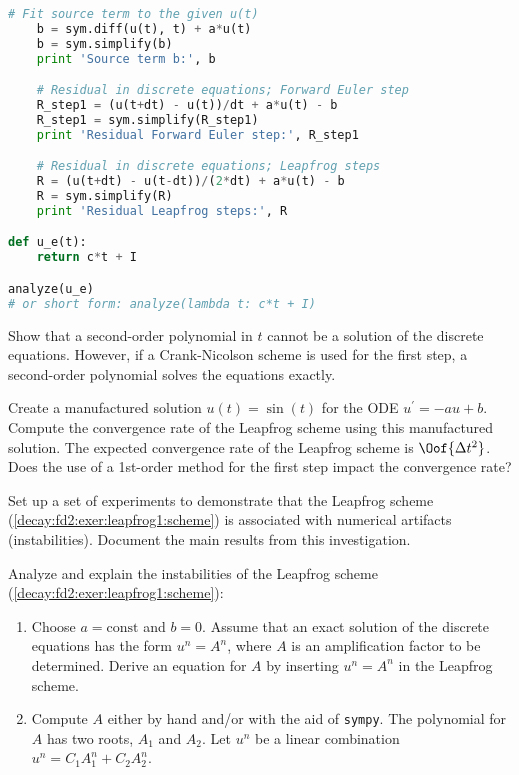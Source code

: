 \documentclass[graybox,sectrefs,envcountresetchap,open=right,final]{svmonodo}
\newenvironment{doconceexercise}{}{}
\begin{document}
\begin{doconceexercise}
\begin{lstlisting}[language=Python,style=blue1_bluegreen]
    # Fit source term to the given u(t)
    b = sym.diff(u(t), t) + a*u(t)
    b = sym.simplify(b)
    print 'Source term b:', b

    # Residual in discrete equations; Forward Euler step
    R_step1 = (u(t+dt) - u(t))/dt + a*u(t) - b
    R_step1 = sym.simplify(R_step1)
    print 'Residual Forward Euler step:', R_step1

    # Residual in discrete equations; Leapfrog steps
    R = (u(t+dt) - u(t-dt))/(2*dt) + a*u(t) - b
    R = sym.simplify(R)
    print 'Residual Leapfrog steps:', R

def u_e(t):
    return c*t + I

analyze(u_e)
# or short form: analyze(lambda t: c*t + I)
\end{lstlisting}


Show that a second-order polynomial in $t$ cannot be a solution of the discrete
equations. However, if a Crank-Nicolson scheme is used for the first
step, a second-order polynomial solves the equations exactly.


Create a manufactured solution $u(t)=\sin(t)$ for the ODE
$u^{\prime}=-au+b$.
Compute the convergence rate of the Leapfrog scheme using this
manufactured solution. The expected convergence rate of the
Leapfrog scheme is $\Oof{\Delta t^2}$. Does the use of a
1st-order method for the first step impact the convergence rate?


Set up a set of experiments to demonstrate that the Leapfrog scheme
(\ref{decay:fd2:exer:leapfrog1:scheme}) is associated with numerical artifacts
(instabilities). Document the main results from this investigation.

Analyze and explain the
instabilities of the Leapfrog scheme (\ref{decay:fd2:exer:leapfrog1:scheme}):

\begin{enumerate}
\item Choose $a=\mbox{const}$ and $b=0$. Assume that an exact solution
   of the discrete equations has
   the form $u^n=A^n$, where $A$ is an amplification factor to
   be determined. Derive an equation for $A$ by inserting $u^n=A^n$
   in the Leapfrog scheme.

\item Compute $A$ either by hand and/or with the aid of \texttt{sympy}.
   The polynomial for $A$ has two roots, $A_1$ and $A_2$. Let
   $u^n$ be a linear combination $u^n=C_1A_1^n + C_2A_2^n$.


\end{enumerate}
\end{doconceexercise}
\end{document}
